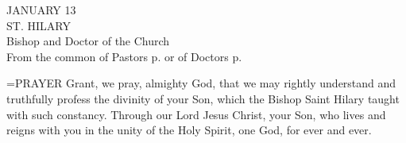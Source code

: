 \begin{center}\normalsize JANUARY 13\\
\footnotesize ST. HILARY\\
\footnotesize Bishop and Doctor of the Church\\
\footnotesize From the common of Pastors p.   or of Doctors p.  \\
\end{center}

\hangindent=\parindent \small{PRAYER 
Grant, we pray, almighty God,
that we may rightly understand and truthfully profess
the divinity of your Son,
which the Bishop Saint Hilary taught with such constancy.
Through our Lord Jesus Christ, your Son,
who lives and reigns with you in the unity of the Holy Spirit,
one God, for ever and ever.
 \\}
 
